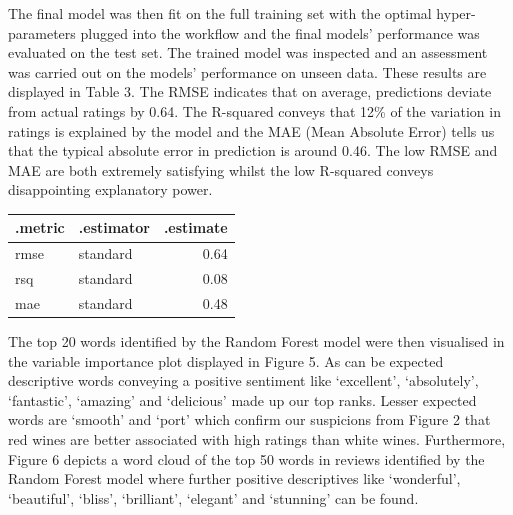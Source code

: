 \documentclass[11pt,preprint]{elsarticle}
\let\origtable\table
\let\endorigtable\endtable
\renewenvironment{table}[1][2] {
    \expandafter\origtable\expandafter[H]
} {
    \endorigtable
}
\numberwithin{equation}{section}
\numberwithin{figure}{section}
\numberwithin{table}{section}
\begin{document}
The final model was then fit on the full training set with the optimal
hyper-parameters plugged into the workflow and the final models'
performance was evaluated on the test set. The trained model was
inspected and an assessment was carried out on the models' performance
on unseen data. These results are displayed in Table 3. The RMSE
indicates that on average, predictions deviate from actual ratings by
0.64. The R-squared conveys that 12\% of the variation in ratings is
explained by the model and the MAE (Mean Absolute Error) tells us that
the typical absolute error in prediction is around 0.46. The low RMSE
and MAE are both extremely satisfying whilst the low R-squared conveys
disappointing explanatory power.

\begin{table}[ht]
\centering
\begin{tabular}{|l|l|r|}
\hline
\textbf{.metric} & \textbf{.estimator} & \textbf{.estimate} \\
\hline
rmse & standard & 0.64 \\
rsq  & standard & 0.08 \\
mae  & standard & 0.48 \\
\hline
\end{tabular}
\caption{Model Performance Metrics}
\label{tab:model_metrics}
\end{table}

The top 20 words identified by the Random Forest model were then
visualised in the variable importance plot displayed in Figure 5. As can
be expected descriptive words conveying a positive sentiment like
`excellent', `absolutely', `fantastic', `amazing' and `delicious' made
up our top ranks. Lesser expected words are `smooth' and `port' which
confirm our suspicions from Figure 2 that red wines are better
associated with high ratings than white wines. Furthermore, Figure 6
depicts a word cloud of the top 50 words in reviews identified by the
Random Forest model where further positive descriptives like
`wonderful', `beautiful', `bliss', `brilliant', `elegant' and `stunning'
can be found.
\end{document}
